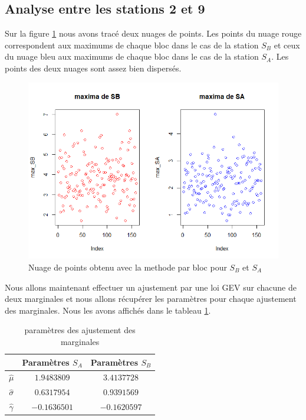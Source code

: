 \documentclass[a4paper,french,10pt]{article}
\begin{document}
\subsection{Analyse entre les stations 2 et 9}

Sur la figure \ref{max_SB_SA} nous avons tracé deux nuages de points. Les points du nuage rouge correspondent aux maximums de chaque bloc dans le cas de la station $S_B$ et ceux du nuage bleu aux maximums de chaque bloc dans le cas de la station $S_A$. Les points des deux nuages sont assez bien dispersés.
\begin{figure}[htp] 
	\centering
	\includegraphics[scale=0.45]{images/max_SB_SA.png}
	\caption{Nuage de points obtenu avec la methode par bloc pour $S_B$ et $S_A$}
	\label{max_SB_SA}
\end{figure}

Nous allons maintenant effectuer un ajustement par une loi GEV sur chacune de deux marginales et nous allons récupérer les paramètres pour chaque ajustement des marginales. Nous les avons affichés dans le tableau \ref{param}.

\begin{table}[htp]
	\center
	\begin{tabular}{|c||c|c|}
		\hline
		 & Paramètres $S_A$ & Paramètres $S_B$\\
		\hline
		$\widehat{\mu}$ & $1.9483809$ & $3.4137728$ \\
		\hline
		$\widehat{\sigma}$ & $0.6317954$ & $0.9391569$ \\
		\hline
		$\widehat{\gamma}$ & $-0.1636501$ & $-0.1620597$ \\
		\hline
	\end{tabular}
	\caption{paramètres des ajustement des marginales}
	\label{param}
\end{table}
\end{document}
